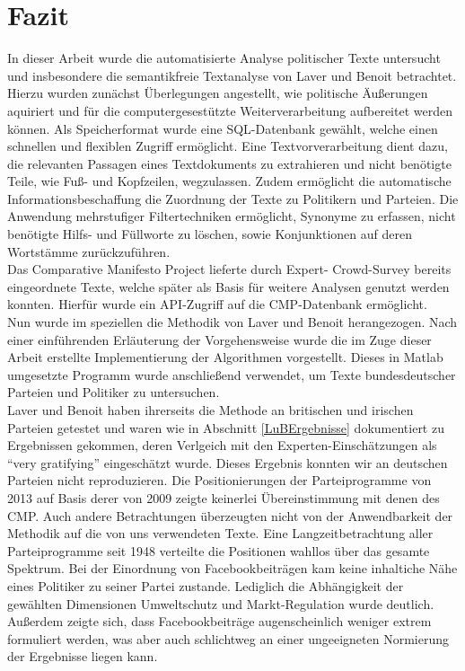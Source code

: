 
\section{Fazit}

In dieser Arbeit wurde die automatisierte Analyse politischer Texte untersucht und insbesondere die semantikfreie Textanalyse von Laver und Benoit \cite{LuB} betrachtet. \\
Hierzu wurden zunächst Überlegungen angestellt, wie politische Äußerungen aquiriert und für die computergesestützte Weiterverarbeitung aufbereitet werden können. Als Speicherformat wurde eine SQL-Datenbank gewählt, welche einen schnellen und flexiblen Zugriff ermöglicht.
Eine Textvorverarbeitung dient dazu, die relevanten Passagen eines Textdokuments zu extrahieren und nicht benötigte Teile, wie Fuß- und Kopfzeilen, wegzulassen. Zudem ermöglicht die automatische Informationsbeschaffung die Zuordnung der Texte zu Politikern und Parteien. Die Anwendung mehrstufiger Filtertechniken ermöglicht, Synonyme zu erfassen, nicht benötigte Hilfs- und Füllworte zu löschen, sowie Konjunktionen auf deren Wortstämme zurückzuführen. \\
Das Comparative Manifesto Project lieferte durch Expert- Crowd-Survey bereits eingeordnete Texte, welche später als Basis für weitere Analysen genutzt werden konnten. Hierfür wurde ein API-Zugriff auf die CMP-Datenbank ermöglicht. \\
Nun wurde im speziellen die Methodik von Laver und Benoit herangezogen. Nach einer einführenden Erläuterung der Vorgehensweise wurde die im Zuge dieser Arbeit erstellte Implementierung der Algorithmen vorgestellt. Dieses in Matlab umgesetzte Programm wurde anschließend verwendet, um Texte bundesdeutscher Parteien und Politiker zu untersuchen.\\
Laver und Benoit haben ihrerseits die Methode an britischen und irischen Parteien getestet und waren wie in Abschnitt \ref{LuBErgebnisse} dokumentiert zu Ergebnissen gekommen, deren Verlgeich mit den Experten-Einschätzungen als \enquote{very gratifying} \cite{LuB} eingeschätzt wurde. Dieses Ergebnis konnten wir an deutschen Parteien nicht reproduzieren. Die Positionierungen der Parteiprogramme von 2013 auf Basis derer von 2009 zeigte keinerlei Übereinstimmung mit denen des CMP. Auch andere Betrachtungen überzeugten nicht von der Anwendbarkeit der Methodik auf die von uns verwendeten Texte. Eine Langzeitbetrachtung aller Parteiprogramme seit 1948 verteilte die Positionen wahllos über das gesamte Spektrum. Bei der Einordnung von Facebookbeiträgen kam keine inhaltiche Nähe eines Politiker zu seiner Partei zustande. Lediglich die Abhängigkeit der gewählten Dimensionen Umweltschutz und Markt-Regulation wurde deutlich. Außerdem zeigte sich, dass Facebookbeiträge augenscheinlich weniger extrem formuliert werden, was aber auch schlichtweg an einer ungeeigneten Normierung der Ergebnisse liegen kann. \\
